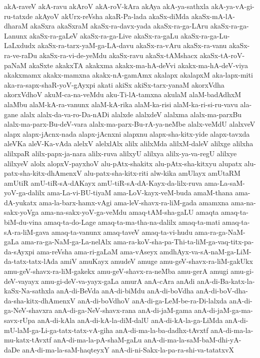{akA-raveV
akA-ravu
akAroV
akA-roV-kAra
akAya
akA-ya-sathxla
akA-ya-vA-gi-ru-tatxde
akAyoV
akUrx-reVsha
akaR-Pa-lada
akaSx-diMda
akaSx-mA-lA-dharaM
akaSxra
akaSxraM
akaSx-ra-davx-yada
akaSx-ra-ga-LAru
akaSx-ra-ga-Lanunx
akaSx-ra-gaLeV
akaSx-ra-ga-Live
akaSx-ra-gaLu
akaSx-ra-ga-Lu-LaLxdudx
akaSx-ra-tarx-yaM-ga-LA-davu
akaSx-ra-vAru
akaSx-ra-vanu
akaSx-ra-ve-raDu
akaSx-ra-vi-de-yeMdu
akaSx-ravu
akaSx-tAMshacx
akaSx-tA-roV-paNaM
akaSxte
akakxTA
akakxma
akakx-ma-hA-deVvi
akakx-ma-hA-deV-viya
akakxmamx
akakx-mamxna
akakx-nA-gamAmx
akalapx
akalapxM
aka-lapx-miti
aka-ra-sapx-shaR-yoV-gAyxpi
akati
akiSx
akiSx-tarx-yanaM
akorxVdha
akorxVdhoV
akuM-ca-na-veMdu
aku-Ti-lA-tamxna
akulaM
alaM-badAdhxM
alaMbu
alaM-kA-ra-vanunx
alaM-kA-rika
alaM-ka-risi
alaM-ka-ri-si-ru-vavu
ala-gane
alalx
alalx-da-va-ro-Da-nADi
alalxde
alalxdeV
alalxma
alalx-ma-parxBu
alalx-ma-parx-Bu-deV-vara
alalx-ma-parx-Bu-rA-ya-neMbe
alalx-veMdU
alalxveV
alapx
alapx-jAcnx-nada
alapx-jAcnxni
alapxnu
alapx-sha-kitx-yide
alapx-tavxda
aleVKa
aleV-Ka-vAda
alelxV
alelxlAlx
alilx
alilxMda
alilxM-daleV
alilxge
alilxha
alilxpaR
alilx-papx-ja-nara
alilx-ruva
alilxyU
alilxya
alilx-ya-va-regU
alilxye
alilxyeV
alolx
alopxV-payxhoV
alu-pAtx-shakitx
alu-pAtx-sha-kitxyu
alupatx
alu-patx-sha-kitx-dhAmenxV
alu-patx-sha-kitx-riti
alw-kika
amUlayx
amUtaRM
amUtiR
amU-tiR-sA-dAKayx
amU-tiR-sA-dA-Kayx-da-lilx-ruva
ama-La-saM-yoV-ga-dalilx
ama-La-vi-BU-tiyaM
ama-LoV-kayx-veM-buda
amaM-thana
ama-dA-yukatx
ama-la-barx-hamx-vAgi
ama-leV-shavx-ra-liM-gada
amamxna
ama-na-sakx-yoVga
ama-na-sakx-yoV-ga-veMdu
amaq-tAM-sha-gaLU
amaqta
amaq-ta-biM-du-vina
amaq-ta-do-Lage
amaq-ta-ma-tha-na-dalilx
amaq-ta-mati
amaq-ta-sA-ra-liM-gava
amaq-ta-vanunx
amaq-taveV
amaq-ta-vi-hudu
ama-ra-ga-NaM-gaLa
ama-ra-ga-NaM-ga-La-nelAlx
ama-ra-koV-sha-pa-Thi-ta-liM-ga-vaq-titx-pa-da-sAyxpi
ama-reVsha
ama-ri-gaLaM
ama-vAseyx
amdhAyx-va-sA-naM-ga-LiM-da-tatx-tatx-lAda
amiV
amuKayx
amudeV
amuge
amu-geV-shavx-ra-liM-gakUkx
amu-geV-shavx-ra-liM-gakekx
amu-geV-shavx-ra-neMba
amu-gerA
amugi
amu-gi-deV-vayayx
amu-gi-deV-va-yayx-gaLa
amurA
anA-cAra
anAdi
anA-di-Ba-katx-la-kaSx-Na-sathxla
anA-di-BeVda
anA-di-biMdu
anA-di-boVdha
anA-di-boV-dha-da-sha-kitx-dhAmenxV
anA-di-boVdhoV
anA-di-ga-LeM-be-ra-Di-lalxda
anA-di-ga-NeV-shavxra
anA-di-ga-NeV-shavx-rana
anA-di-jaM-gama
anA-di-jaM-ga-ma-savx-rUpa
anA-di-kAla
anA-di-kA-la-diM-dalU
anA-di-kA-la-ga-LiMda
anA-di-mU-laM-ga-Li-ga-tatx-tatx-vA-giha
anA-di-ma-la-ba-dadhx-tAvxtf
anA-di-ma-la-mu-katx-tAvxtf
anA-di-ma-la-pA-shaM-gaLu
anA-di-ma-la-saM-baM-dhi-yA-daDe
anA-di-ma-la-saM-haqteyxY
anA-di-ni-Sakx-la-pa-ra-shi-va-tatatxvX
}

